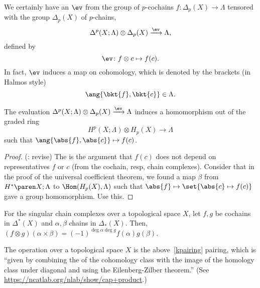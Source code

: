 We certainly have an  $\ev$ from the group of $p$-cochains $f \colon \Delta_p(X) \to \Lambda$ tensored with the group $\Delta_p(X)$ of $p$-chains,
\[
    \Delta^p(X; \Lambda) \otimes \Delta_p(X) \xrightarrow{\ev} \Lambda,
\]
defined by
\[
    \ev\colon f \otimes c \mapsto f(c).
\] 
In fact, $\ev$ induces a map on cohomology, which is denoted by the brackets (in Halmos style) 
\[
    \ang{\bkt{f}, \bkt{c}} \in \Lambda.
\]

\begin{lem}
   The evaluation $\Delta^p(X; \Lambda) \otimes \Delta_p(X) \xrightarrow{\ev} \Lambda$ induces a homomorphism out of the graded ring
   \begin{equation}
       \label{kpairing}
       H^p(X;\Lambda) \otimes H_p(X) \to \Lambda
   \end{equation}
   such that $\ang{\abs{f}, \abs{ c }}\mapsto f(c)$.
\end{lem}

\begin{proof}
    (\TODO: revise) The  is the argument that $f(c)$ does not depend on representatives $f$ or $c$ (from the cochain, resp, chain complexes). Consider that in the proof of the universal coefficient theorem, we found a map $\beta$ from $\coho{X}{\Lambda}$ to $\Hom(H_p(X), \Lambda)$ such that $\abs{f} \mapsto \set{ \abs{c} \mapsto f(c) }$ gave a group homomorphism. Use this.
\end{proof}

\begin{lem}
    For the singular chain complexes over a topological space $X$, let $f, g$ be cochains in $\Delta^*(X)$ and $\alpha, \beta$ chains in $\Delta_*(X)$. 
    Then, $(f\otimes g)(\alpha \times \beta) = (-1)^{\deg \alpha \deg g} f(\alpha)g(\beta)$.
\end{lem}

\begin{defn}
    The  operation over a topological space $X$ is the above~\eqref{kpairing} pairing, which is ``given by combining the  of the cohomology class with the image of the homology class under diagonal and using the Eilenberg-Zilber theorem.'' (See \url{https://ncatlab.org/nlab/show/cap+product}.)
\end{defn}

